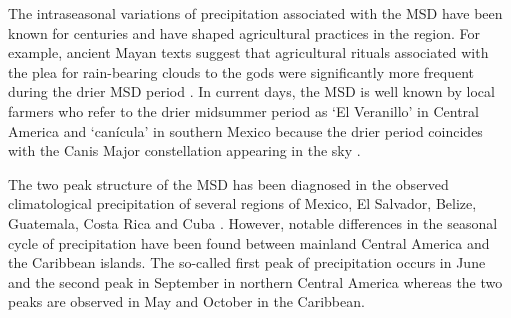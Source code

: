  

The intraseasonal variations of precipitation associated with the MSD have been known for centuries and have shaped agricultural practices in the region. 
For example,  ancient Mayan texts suggest that agricultural rituals associated with the plea for rain-bearing clouds to the gods were significantly more frequent during the drier MSD period \citep{jobbova2018ritual}. In current days, the MSD is well known by local farmers who refer to the drier midsummer period as `El Veranillo' in Central America and `can\' icula' in southern Mexico because the drier period  coincides with the Canis Major constellation appearing in the sky \citep{dilley1996}.
%

The two peak structure of the MSD has been diagnosed in the observed climatological precipitation of several regions of Mexico, El Salvador, Belize, Guatemala, Costa Rica and Cuba \citep[e.g.][]{mosino1966,magana1999,duranquesada2017,perdigon2018,martinez2019}.
However, notable differences in the seasonal cycle of precipitation have been found between mainland Central America and the Caribbean islands. The so-called first peak of precipitation occurs in June and the second peak in September in northern Central America whereas the two peaks are observed in May and October in the Caribbean.

